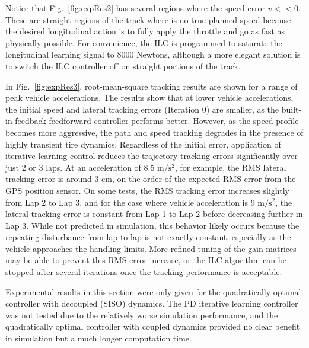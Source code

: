 \documentclass[9pt,shortpaper,twoside,web]{ieeecolor}
\begin{document}
{{{ Notice that Fig.~\ref{fig:expRes2} has
several regions where the speed error $v << 0$. These are straight regions of the track where is no true planned speed
because the desired longitudinal action is to fully apply the throttle and go as fast as physically possible. For convenience, the ILC is programmed to saturate the longitudinal
learning signal to 8000 Newtons, although a more elegant solution is to switch the ILC controller off on straight portions of the track. 

In Fig.~\ref{fig:expRes3}, root-mean-square tracking results are shown for a range of peak vehicle accelerations. 
The results show that at lower vehicle accelerations,
the initial speed and lateral tracking errors (Iteration 0) are smaller, as the built-in feedback-feedforward controller 
performs better. However, as the speed profile becomes more aggressive, the path and speed tracking degrades in the presence
of highly transient tire dynamics. Regardless of the initial error, application of iterative learning control 
reduces the trajectory tracking errors significantly over just 2 or 3 laps. At an acceleration of 8.5 $\mathrm{m/s^2}$, for example, the RMS
lateral tracking error is around 3 cm, on the order of the expected RMS error from the GPS position sensor. 
On some tests, the RMS tracking error 
increases slightly from
Lap 2 to Lap 3, and for the case where vehicle acceleration is 9 $\mathrm{m/s^2}$, the lateral tracking error is constant from Lap 1 to Lap 2
before decreasing further in Lap 3. While not predicted in simulation, this behavior likely occurs because the repeating disturbance
from lap-to-lap is not exactly constant, especially as the vehicle approaches the handling limits. More refined tuning of the gain matrices may be able to prevent 
this RMS error increase, or the ILC algorithm can be stopped after several iterations once the tracking performance is acceptable.

Experimental results in this section were only given for the quadratically optimal controller with decoupled (SISO) dynamics. 
The PD iterative learning controller was not tested due to the relatively worse simulation performance, and the quadratically optimal controller with coupled dynamics provided no clear benefit in simulation but a much longer computation time. 



}}}
\end{document}
